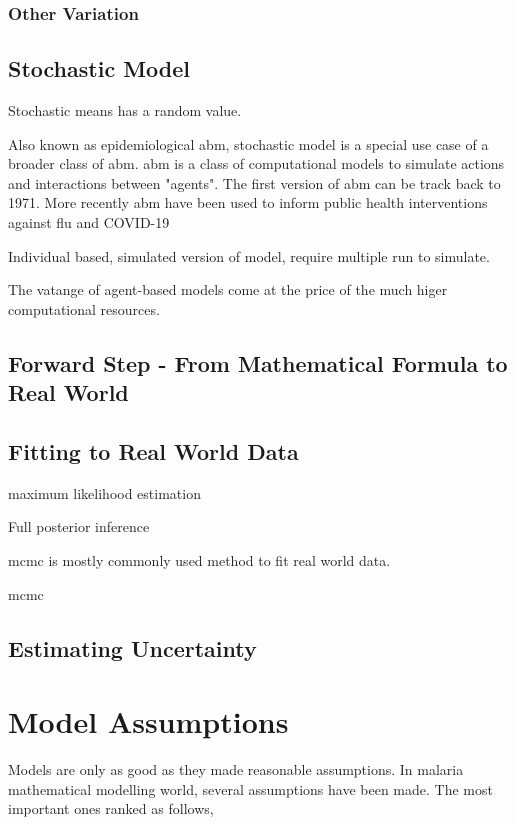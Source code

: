 \documentclass[a4paper, 12pt, twoside]{article}
\begin{document}
\subsubsection{Other Variation}

\subsection{Stochastic Model}

Stochastic means has a random value.

Also known as epidemiological \gls{abm}, stochastic model is a special use case of a broader class of \gls{abm}. \gls{abm} is a class of computational models to simulate actions and interactions between "agents". The first version of \gls{abm} can be track back to 1971\cite{Schelling1971}. More recently \gls{abm} have been used to inform public health interventions against flu\cite{Ferguson2006a, Ferguson2005} and COVID-19\cite{Maziarz2020, Ferguson2020, Chang2020}

Individual based, simulated version of model, require multiple run to simulate.

The vatange of agent-based models come at the price of the much higer computational resources.

\subsection{Forward Step - From Mathematical Formula to Real World}

\subsection{Fitting to Real World Data}

maximum likelihood estimation

Full posterior inference

\gls{mcmc} is mostly commonly used method to fit real world data.

\gls{mcmc}

\subsection{Estimating Uncertainty}

\section{Model Assumptions}
Models are only as good as they made reasonable assumptions. In malaria mathematical modelling world, several assumptions have been made. The most important ones ranked as follows,
\end{document}
